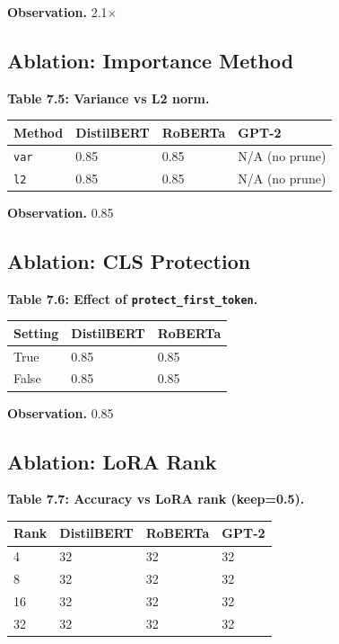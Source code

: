 \textbf{Observation.} 2.1$\times$

\subsection{Ablation: Importance Method}

\textbf{Table 7.5: Variance vs L2 norm.}

\begin{table}[H]
\centering
\small
\begin{tabular}{llll}
\toprule
\textbf{Method} & \textbf{DistilBERT} & \textbf{RoBERTa} & \textbf{GPT-2} \\
\midrule
\texttt{var} & 0.85 & 0.85 & N/A (no prune) \\
\texttt{l2} & 0.85 & 0.85 & N/A (no prune) \\
\bottomrule
\end{tabular}
\end{table}

\textbf{Observation.} 0.85

\subsection{Ablation: CLS Protection}

\textbf{Table 7.6: Effect of \texttt{protect\_first\_token}.}

\begin{table}[H]
\centering
\small
\begin{tabular}{lll}
\toprule
\textbf{Setting} & \textbf{DistilBERT} & \textbf{RoBERTa} \\
\midrule
True & 0.85 & 0.85 \\
False & 0.85 & 0.85 \\
\bottomrule
\end{tabular}
\end{table}

\textbf{Observation.} 0.85

\subsection{Ablation: LoRA Rank}

\textbf{Table 7.7: Accuracy vs LoRA rank (keep=0.5).}

\begin{table}[H]
\centering
\small
\begin{tabular}{llll}
\toprule
\textbf{Rank} & \textbf{DistilBERT} & \textbf{RoBERTa} & \textbf{GPT-2} \\
\midrule
4 & 32 & 32 & 32 \\
8 & 32 & 32 & 32 \\
16 & 32 & 32 & 32 \\
32 & 32 & 32 & 32 \\
\bottomrule
\end{tabular}
\end{table}

